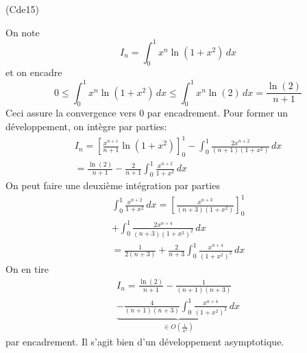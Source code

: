 \begin{tiny}(Cde15)\end{tiny} On note 
\begin{displaymath}
  I_n = \int_{0}^{1}x^n \ln(1+x^2)\,dx
\end{displaymath}
et on encadre 
\begin{displaymath}
  0\leq \int_{0}^{1}x^n \ln(1+x^2)\,dx \leq \int_{0}^{1}x^n \ln(2)\,dx = \frac{\ln(2)}{n+1}
\end{displaymath}
Ceci assure la convergence vers $0$ par encadrement. Pour former un développement, on intègre par parties:
\begin{multline*}
I_n = \left[ \frac{x^{n+1}}{n+1}\ln(1+x^2)\right]_{0}^{1}- \int_{0}^{1} \frac{2x^{n+2}}{(n+1)(1+x^2)}\,dx\\
= \frac{\ln(2)}{n+1} - \frac{2}{n+1} \int_{0}^{1}\frac{x^{n+2}}{1+x^2}\,dx
\end{multline*}
On peut faire une deuxième intégration par parties
\begin{multline*}
\int_{0}^{1}\frac{x^{n+2}}{1+x^2}\,dx
= \left[ \frac{x^{n+3}}{(n+3)(1+x^2)}\right]_{0}^{1} \\
+ \int_{0}^{1}\frac{2x^{n+4}}{(n+3)(1+x^2)^2}\,dx \\
= \frac{1}{2(n+3)}+\frac{2}{n+3}\int_{0}^{1}\frac{x^{n+4}}{(1+x^2)^2}\,dx
\end{multline*}
On en tire
\begin{multline*}
  I_n = \frac{\ln(2)}{n+1} -  \frac{1}{(n+1)(n+3)}\\ 
  \underset{\in O(\frac{1}{n^3})}{\underbrace{-\frac{4}{(n+1)(n+3)}\int_{0}^{1}\frac{x^{n+4}}{(1+x^2)^2}\,dx}}
\end{multline*}
par encadrement. Il s'agit bien d'un développement asymptotique.